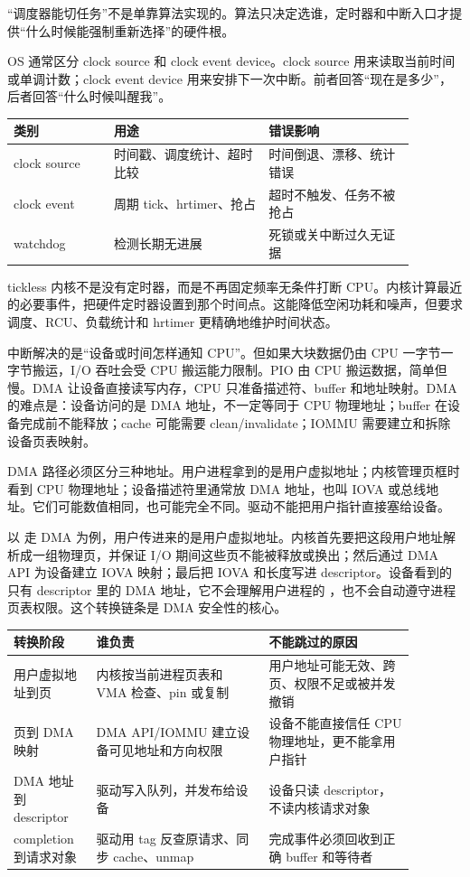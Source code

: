 “调度器能切任务”不是单靠算法实现的。算法只决定选谁，定时器和中断入口才提供“什么时候能强制重新选择”的硬件根。

OS 通常区分 clock source 和 clock event device。clock source 用来读取当前时间或单调计数；clock event device 用来安排下一次中断。前者回答“现在是多少”，后者回答“什么时候叫醒我”。

\begin{longtable}{p{0.22\linewidth}p{0.34\linewidth}p{0.32\linewidth}}
\toprule
类别 & 用途 & 错误影响 \\
\midrule
clock source & 时间戳、调度统计、超时比较 & 时间倒退、漂移、统计错误 \\
clock event & 周期 tick、hrtimer、抢占 & 超时不触发、任务不被抢占 \\
watchdog & 检测长期无进展 & 死锁或关中断过久无证据 \\
\bottomrule
\end{longtable}

tickless 内核不是没有定时器，而是不再固定频率无条件打断 CPU。内核计算最近的必要事件，把硬件定时器设置到那个时间点。这能降低空闲功耗和噪声，但要求调度、RCU、负载统计和 hrtimer 更精确地维护时间状态。

中断解决的是“设备或时间怎样通知 CPU”。但如果大块数据仍由 CPU 一字节一字节搬运，I/O 吞吐会受 CPU 搬运能力限制。PIO 由 CPU 搬运数据，简单但慢。DMA 让设备直接读写内存，CPU 只准备描述符、buffer 和地址映射。DMA 的难点是：设备访问的是 DMA 地址，不一定等同于 CPU 物理地址；buffer 在设备完成前不能释放；cache 可能需要 clean/invalidate；IOMMU 需要建立和拆除设备页表映射。

DMA 路径必须区分三种地址。用户进程拿到的是用户虚拟地址；内核管理页框时看到 CPU 物理地址；设备描述符里通常放 DMA 地址，也叫 IOVA 或总线地址。它们可能数值相同，也可能完全不同。驱动不能把用户指针直接塞给设备。

以  走 DMA 为例，用户传进来的是用户虚拟地址。内核首先要把这段用户地址解析成一组物理页，并保证 I/O 期间这些页不能被释放或换出；然后通过 DMA API 为设备建立 IOVA 映射；最后把 IOVA 和长度写进 descriptor。设备看到的只有 descriptor 里的 DMA 地址，它不会理解用户进程的 ，也不会自动遵守进程页表权限。这个转换链条是 DMA 安全性的核心。

\begin{longtable}{p{0.18\linewidth}p{0.38\linewidth}p{0.32\linewidth}}
\toprule
转换阶段 & 谁负责 & 不能跳过的原因 \\
\midrule
用户虚拟地址到页 & 内核按当前进程页表和 VMA 检查、pin 或复制 & 用户地址可能无效、跨页、权限不足或被并发撤销 \\
页到 DMA 映射 & DMA API/IOMMU 建立设备可见地址和方向权限 & 设备不能直接信任 CPU 物理地址，更不能拿用户指针 \\
DMA 地址到 descriptor & 驱动写入队列，并发布给设备 & 设备只读 descriptor，不读内核请求对象 \\
completion 到请求对象 & 驱动用 tag 反查原请求、同步 cache、unmap & 完成事件必须回收到正确 buffer 和等待者 \\
\bottomrule
\end{longtable}

